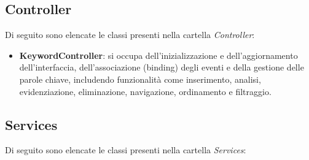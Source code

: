 \subsection{Controller}

Di seguito sono elencate le classi presenti nella cartella \textit{Controller}:

\begin{itemize}
  \item \textbf{KeywordController}: si occupa dell’inizializzazione e dell’aggiornamento dell’interfaccia, dell’associazione (binding) degli eventi e della gestione delle parole chiave, includendo funzionalità come inserimento, analisi, evidenziazione, eliminazione, navigazione, ordinamento e filtraggio.
\end{itemize}

\subsection{Services}

Di seguito sono elencate le classi presenti nella cartella \textit{Services}:


